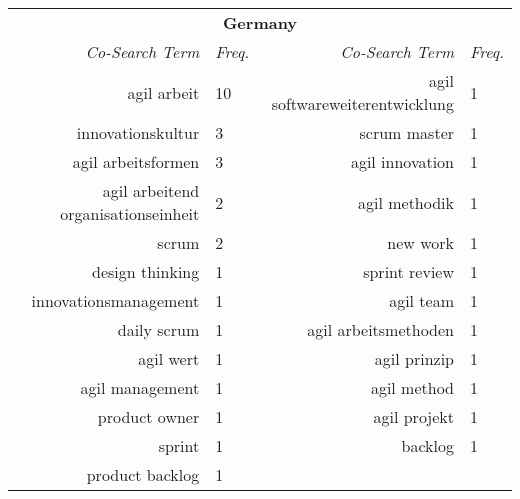 \begin{spacing}{.65}
\begin{table}[!htbp]
{\begin{tabular}{rlrl}
\multicolumn{4}{c}{\textbf{Germany}}                                                                   \\
\textit{Co-Search Term}             & \textit{Freq.} & \textit{Co-Search Term}        & \textit{Freq.} \\ \hline
agil arbeit                         & 10             & agil softwareweiterentwicklung & 1              \\
innovationskultur                   & 3              & scrum master                   & 1              \\
agil arbeitsformen                  & 3              & agil innovation                & 1              \\
agil arbeitend organisationseinheit & 2              & agil methodik                  & 1              \\
scrum                               & 2              & new work                       & 1              \\
design thinking                     & 1              & sprint review                  & 1              \\
innovationsmanagement               & 1              & agil team                      & 1              \\
daily scrum                         & 1              & agil arbeitsmethoden           & 1              \\
agil wert                           & 1              & agil prinzip                   & 1              \\
agil management                     & 1              & agil method                    & 1              \\
product owner                       & 1              & agil projekt                   & 1              \\
sprint                              & 1              & backlog                        & 1              \\
product backlog                     & 1              &                                &               
\end{tabular}%
}
\end{table}
\end{spacing}
\endgroup
